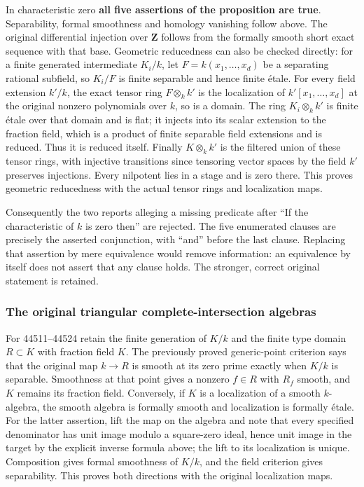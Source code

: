 In characteristic zero \textbf{all five assertions of the proposition are true}. Separability, formal smoothness and homology vanishing follow above. The original differential injection over \(\mathbf Z\) follows from the formally smooth short exact sequence with that base. Geometric reducedness can also be checked directly: for a finite generated intermediate \(K_i/k\), let \(F=k(x_1,\ldots,x_d)\) be a separating rational subfield, so \(K_i/F\) is finite separable and hence finite étale. For every field extension \(k'/k\), the exact tensor ring \(F\otimes_k k'\) is the localization of \(k'[x_1,\ldots,x_d]\) at the original nonzero polynomials over \(k\), so is a domain. The ring \(K_i\otimes_k k'\) is finite étale over that domain and is flat; it injects into its scalar extension to the fraction field, which is a product of finite separable field extensions and is reduced. Thus it is reduced itself. Finally \(K\otimes_k k'\) is the filtered union of these tensor rings, with injective transitions since tensoring vector spaces by the field \(k'\) preserves injections. Every nilpotent lies in a stage and is zero there. This proves geometric reducedness with the actual tensor rings and localization maps.

Consequently the two reports alleging a missing predicate after ``If the characteristic of \(k\) is zero then'' are rejected. The five enumerated clauses are precisely the asserted conjunction, with ``and'' before the last clause. Replacing that assertion by mere equivalence would remove information: an equivalence by itself does not assert that any clause holds. The stronger, correct original statement is retained.

\subsubsection{The original triangular complete-intersection algebras}\label{algebra-proof-063-the-original-triangular-complete-intersection-algebras}

For 44511--44524 retain the finite generation of \(K/k\) and the finite type domain \(R\subset K\) with fraction field \(K\). The previously proved generic-point criterion says that the original map \(k\to R\) is smooth at its zero prime exactly when \(K/k\) is separable. Smoothness at that point gives a nonzero \(f\in R\) with \(R_f\) smooth, and \(K\) remains its fraction field. Conversely, if \(K\) is a localization of a smooth \(k\)-algebra, the smooth algebra is formally smooth and localization is formally étale. For the latter assertion, lift the map on the algebra and note that every specified denominator has unit image modulo a square-zero ideal, hence unit image in the target by the explicit inverse formula above; the lift to its localization is unique. Composition gives formal smoothness of \(K/k\), and the field criterion gives separability. This proves both directions with the original localization maps.

